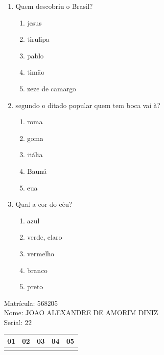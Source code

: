 \documentclass[10pt,a4paper,twocolumn]{report}
\begin{document}
 \begin{enumerate} 
    \item  Quem descobriu o Brasil?





    \begin{enumerate}
    \item  jesus

\item  tirulipa

\item  pablo

\item  timão

\item  zeze de camargo


    \end{enumerate} 
    \item  segundo o ditado popular quem tem boca vai à?





    \begin{enumerate}
    \item  roma

\item  goma

\item  itália

\item  Bauná

\item  eua


    \end{enumerate} 
    \item  Qual a cor do céu?





    \begin{enumerate}
    \item  azul

\item  verde, claro

\item  vermelho

\item  branco

\item  preto


    \end{enumerate}\end{enumerate} 
Matrícula: 568205\\ Nome: JOAO ALEXANDRE DE AMORIM DINIZ \\ Serial: 22\\
\begin{tabular}{|l|l|l|l|l|}\hline
01  &02  &03  &04  &05 \\ \hline 
 & & & & \\ \hline 
\end{tabular}
 \cleardoublepage 
\end{document}
